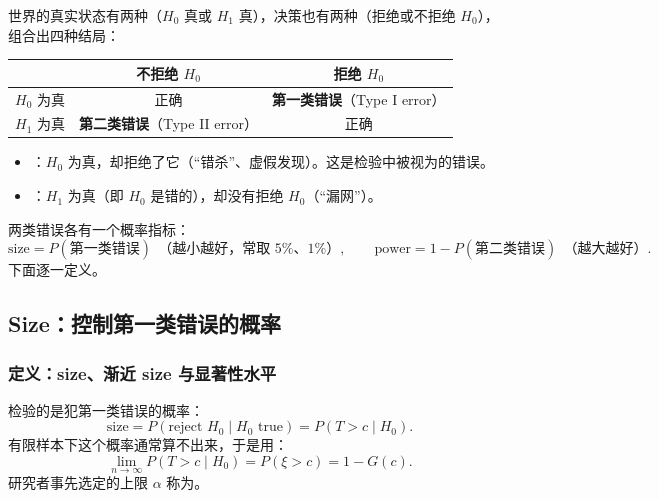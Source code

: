 世界的真实状态有两种（$H_0$ 真或 $H_1$ 真），决策也有两种（拒绝或不拒绝 $H_0$），组合出四种结局：
\begin{center}
\begin{tabular}{@{}lcc@{}}
\toprule
 & 不拒绝 $H_0$ & 拒绝 $H_0$\\
\midrule
$H_0$ 为真 & 正确 & \textbf{第一类错误}（Type I error）\\
$H_1$ 为真 & \textbf{第二类错误}（Type II error） & 正确\\
\bottomrule
\end{tabular}
\end{center}

\begin{defn}[两类错误]\label{def:U06a-errors}
\begin{itemize}
  \item {}：$H_0$ 为真，却拒绝了它（“错杀”、虚假发现）。这是检验中被视为的错误。
  \item {}：$H_1$ 为真（即 $H_0$ 是错的），却没有拒绝 $H_0$（“漏网”）。
\end{itemize}
\end{defn}

两类错误各有一个概率指标：
\[
\text{size}=P(\text{第一类错误})\ \ \text{（越小越好，常取 5\%、1\%）},\qquad
\text{power}=1-P(\text{第二类错误})\ \ \text{（越大越好）}.
\]
下面逐一定义。

\subsection{Size：控制第一类错误的概率}

\subsubsection{定义：size、渐近 size 与显著性水平}

\begin{defn}\label{def:U06a-size}
检验的是犯第一类错误的概率：
\[
\text{size}=P(\text{reject }H_0\mid H_0\text{ true})=P(T>c\mid H_0).
\]
有限样本下这个概率通常算不出来，于是用：
\[
\lim_{n\to\infty}P(T>c\mid H_0)=P(\xi>c)=1-G(c).
\]
研究者事先选定的上限 $\alpha$ 称为。
\end{defn}

